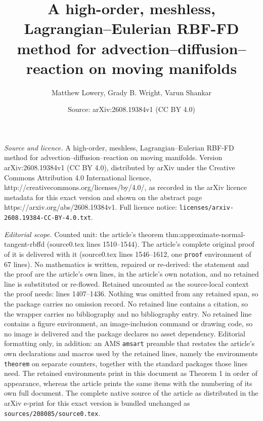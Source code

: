 \documentclass[10pt,a4paper]{amsart}
\title{A high-order, meshless, Lagrangian--Eulerian RBF-FD method for advection--diffusion--reaction on moving manifolds}
\author{Matthew Lowery, Grady B. Wright, Varun Shankar}
\date{Source: arXiv:2608.19384v1 (CC BY 4.0)}
\begin{document}
\maketitle

\noindent\emph{Source and licence.} A high-order, meshless, Lagrangian--Eulerian RBF-FD method for advection--diffusion--reaction on moving manifolds. Version arXiv:2608.19384v1 (CC BY 4.0), distributed by arXiv under the Creative Commons Attribution 4.0 International licence, http://creativecommons.org/licenses/by/4.0/, as recorded in the arXiv licence metadata for this exact version and shown on the abstract page https://arxiv.org/abs/2608.19384v1. Full licence notice: \texttt{licenses/arxiv-2608.19384-CC-BY-4.0.txt}.\par\smallskip

\noindent\textit{Editorial scope.} Counted unit: the article's theorem thm:approximate-normal-tangent-rbffd (source0.tex lines 1510--1544). The article's complete original proof of it is delivered with it (source0.tex lines 1546--1612, one \texttt{proof} environment of 67 lines). No mathematics is written, repaired or re-derived: the statement and the proof are the article's own lines, in the article's own notation, and no retained line is substituted or re-flowed.  Retained uncounted as the source-local context the proof needs: lines 1407--1436.  Nothing was omitted from any retained span, so the package carries no omission record.  No retained line contains a citation, so the wrapper carries no bibliography and no bibliography entry.  No retained line contains a figure environment, an image-inclusion command or drawing code, so no image is delivered and the package declares no asset dependency.  Editorial formatting only, in addition: an AMS \texttt{amsart} preamble that restates the article's own declarations and macros used by the retained lines, namely the environments \texttt{theorem} on separate counters, together with the standard packages those lines need.  The retained environments print in this document as Theorem 1 in order of appearance, whereas the article prints the same items with the numbering of its own full document.  The complete native source of the article as distributed in the arXiv e-print for this exact version is bundled unchanged as \texttt{sources/208085/source0.tex}.
\end{document}
